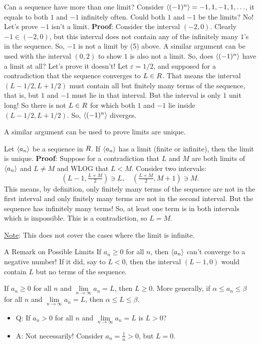 \begin{Example}{}{}
    Can a sequence have more than one limit?
    Consider $ \langle(-1)^n\rangle=-1,1,-1,1,\ldots $, it equals to both $ 1 $ and $ -1 $ infinitely often. Could both $ 1 $ and $ -1 $
    be the limits? No! Let's prove $ -1 $ isn't a limit.
    \tcblower{}
    \textbf{Proof}: Consider the interval $ (-2,0) $. Clearly $ -1\in(-2,0) $, but
    this interval does not contain any of the infinitely many $ 1 $'s in the sequence. So, $ -1 $
    is not a limit by (5) above. A similar argument can be used with the interval $ (0,2) $ to show
    $ 1 $ is also not a limit. So, does $ \langle(-1)^n\rangle $ have a limit at all? Let's prove it doesn't!
    Let $ \varepsilon=1/2 $, and supposed for a contradiction that the sequence converges to $ L\in\relax{R} $. That means
    the interval $ (L-1/2,L+1/2) $ must contain all but finitely many terms of the sequence, that is, but $ 1 $ and $ -1 $
    must lie in that interval. But the interval is only $ 1 $ unit long! So there is not $ L\in\relax{R} $ for which both $ 1 $ and $ -1 $
    lie inside $ (L-1/2,L+1/2) $. So, $ \langle(-1)^n\rangle $ diverges.
\end{Example}
A similar argument can be used to prove limits are unique.
\begin{Theorem}{}{}
    Let $ \langle a_n\rangle $ be a sequence in $ \relax{R} $. If $ \langle a_n\rangle $ has a limit (finite or infinite), then the limit is unique.
    \tcblower{}
    \textbf{Proof}: Suppose for a contradiction that $ L $ and $ M $
    are both limits of $ \langle a_n\rangle $ and $ L\ne M $ and WLOG that $ L<M $. Consider two intervals:
    \[ (L-1,\tfrac{L+M}{2})\ni L,\quad (\tfrac{L+M}{2},M+1)\ni M. \]
    This means, by definition, only finitely many terms of the sequence are not in the first interval and only finitely
    many terms are not in the second interval. But the sequence has infinitely many terms! So, at least one term is in both intervals
    which is impossible. This is a contradiction, so $ L=M $.

    \underline{Note}: This does not cover the cases where the limit is infinite.
\end{Theorem}
\begin{Remark}{A Remark on Possible Limits}{}
    If $ a_n\ge 0 $ for all $ n $, then $ \langle a_n\rangle $ can't converge to a negative number! If it did, say to $ L<0 $,
    then the interval $ (L-1,0) $ would contain $ L $ but no terms of the sequence.
\end{Remark}
\begin{Theorem}{}{}
    If $ a_n\ge 0 $ for all $ n $ and $ \lim\limits_{{n} \to {\infty}}a_n=L $, then $ L\ge 0 $.
    More generally, if $ \alpha\le a_n\le \beta $ for all $ n $ and $ \lim\limits_{{n} \to {\infty}}a_n=L $,
    then $ \alpha\le L\le \beta $.
\end{Theorem}
\begin{itemize}
    \item Q\@: If $ a_n>0 $ for all $ n $ and $ \lim\limits_{{n} \to {\infty}}a_n=L $ is $ L>0 $?
    \item A\@: Not necessarily! Consider $ a_n=\frac{1}{n}>0 $, but $ L=0 $.
\end{itemize}
